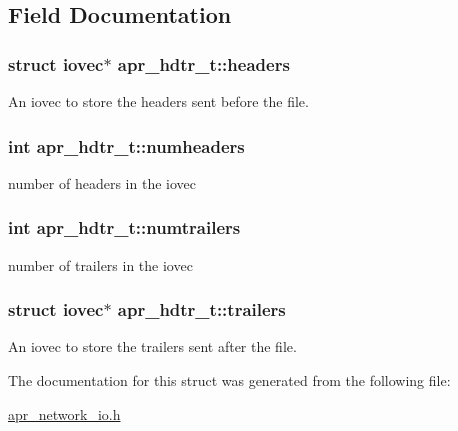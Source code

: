 \subsection{Field Documentation}
\hypertarget{structapr__hdtr__t_afc2035a3ef314f9aa6ae3aabe7c0dc72}{
\subsubsection[{headers}]{\setlength{\rightskip}{0pt plus 5cm}struct iovec$\ast$ apr\-\_\-hdtr\-\_\-t\-::headers}}\label{structapr__hdtr__t_afc2035a3ef314f9aa6ae3aabe7c0dc72}
An iovec to store the headers sent before the file. \hypertarget{structapr__hdtr__t_a8915ade68ef06f4d23005ec0f81e9305}{
\subsubsection[{numheaders}]{\setlength{\rightskip}{0pt plus 5cm}int apr\-\_\-hdtr\-\_\-t\-::numheaders}}\label{structapr__hdtr__t_a8915ade68ef06f4d23005ec0f81e9305}
number of headers in the iovec \hypertarget{structapr__hdtr__t_a9468659de891a5672b0b84cf442e9c7b}{
\subsubsection[{numtrailers}]{\setlength{\rightskip}{0pt plus 5cm}int apr\-\_\-hdtr\-\_\-t\-::numtrailers}}\label{structapr__hdtr__t_a9468659de891a5672b0b84cf442e9c7b}
number of trailers in the iovec \hypertarget{structapr__hdtr__t_a538387cfa0065abc2bfa6ba7393fa3ee}{
\subsubsection[{trailers}]{\setlength{\rightskip}{0pt plus 5cm}struct iovec$\ast$ apr\-\_\-hdtr\-\_\-t\-::trailers}}\label{structapr__hdtr__t_a538387cfa0065abc2bfa6ba7393fa3ee}
An iovec to store the trailers sent after the file. 

The documentation for this struct was generated from the following file\-:\begin{DoxyCompactItemize}
\item 
\hyperlink{apr__network__io_8h}{apr\-\_\-network\-\_\-io.\-h}\end{DoxyCompactItemize}
